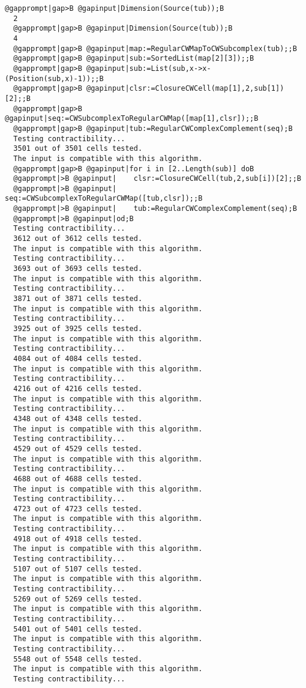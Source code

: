 \documentclass[a4paper,11pt]{report}
\begin{document}
{{\begin{Verbatim}[commandchars=@|B,fontsize=\small,frame=single,label=Example]
  @gapprompt|gap>B @gapinput|Dimension(Source(tub));B
  2
  @gapprompt|gap>B @gapinput|Dimension(Source(tub));B
  4
  @gapprompt|gap>B @gapinput|map:=RegularCWMapToCWSubcomplex(tub);;B
  @gapprompt|gap>B @gapinput|sub:=SortedList(map[2][3]);;B
  @gapprompt|gap>B @gapinput|sub:=List(sub,x->x-(Position(sub,x)-1));;B
  @gapprompt|gap>B @gapinput|clsr:=ClosureCWCell(map[1],2,sub[1])[2];;B
  @gapprompt|gap>B @gapinput|seq:=CWSubcomplexToRegularCWMap([map[1],clsr]);;B
  @gapprompt|gap>B @gapinput|tub:=RegularCWComplexComplement(seq);B
  Testing contractibility...
  3501 out of 3501 cells tested.
  The input is compatible with this algorithm.
  @gapprompt|gap>B @gapinput|for i in [2..Length(sub)] doB
  @gapprompt|>B @gapinput|    clsr:=ClosureCWCell(tub,2,sub[i])[2];;B
  @gapprompt|>B @gapinput|    seq:=CWSubcomplexToRegularCWMap([tub,clsr]);;B
  @gapprompt|>B @gapinput|    tub:=RegularCWComplexComplement(seq);B
  @gapprompt|>B @gapinput|od;B
  Testing contractibility...
  3612 out of 3612 cells tested.
  The input is compatible with this algorithm.
  Testing contractibility...
  3693 out of 3693 cells tested.
  The input is compatible with this algorithm.
  Testing contractibility...
  3871 out of 3871 cells tested.
  The input is compatible with this algorithm.
  Testing contractibility...
  3925 out of 3925 cells tested.
  The input is compatible with this algorithm.
  Testing contractibility...
  4084 out of 4084 cells tested.
  The input is compatible with this algorithm.
  Testing contractibility...
  4216 out of 4216 cells tested.
  The input is compatible with this algorithm.
  Testing contractibility...
  4348 out of 4348 cells tested.
  The input is compatible with this algorithm.
  Testing contractibility...
  4529 out of 4529 cells tested.
  The input is compatible with this algorithm.
  Testing contractibility...
  4688 out of 4688 cells tested.
  The input is compatible with this algorithm.
  Testing contractibility...
  4723 out of 4723 cells tested.
  The input is compatible with this algorithm.
  Testing contractibility...
  4918 out of 4918 cells tested.
  The input is compatible with this algorithm.
  Testing contractibility...
  5107 out of 5107 cells tested.
  The input is compatible with this algorithm.
  Testing contractibility...
  5269 out of 5269 cells tested.
  The input is compatible with this algorithm.
  Testing contractibility...
  5401 out of 5401 cells tested.
  The input is compatible with this algorithm.
  Testing contractibility...
  5548 out of 5548 cells tested.
  The input is compatible with this algorithm.
  Testing contractibility...

\end{Verbatim}}}
\end{document}
